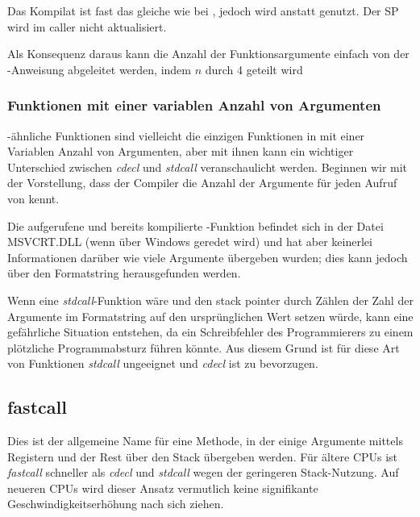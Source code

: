 Das Kompilat ist fast das gleiche wie bei ,
jedoch wird  anstatt  genutzt. Der \ac{SP} wird im \gls{caller} nicht
aktualisiert.

Als Konsequenz daraus kann die Anzahl der Funktionsargumente einfach von der -Anweisung
abgeleitet werden, indem $n$ durch 4 geteilt wird

%


\subsubsection{Funktionen mit einer variablen Anzahl von Argumenten}

\printf-ähnliche Funktionen sind vielleicht die einzigen Funktionen in \CCpp mit einer Variablen
Anzahl von Argumenten, aber mit ihnen kann ein wichtiger Unterschied zwischen \emph{cdecl} und
\emph{stdcall} veranschaulicht werden.
Beginnen wir mit der Vorstellung, dass der Compiler die Anzahl der Argumente für jeden Aufruf
von \printf kennt.

Die aufgerufene und bereits kompilierte \printf-Funktion befindet sich in der Datei MSVCRT.DLL
(wenn über Windows geredet wird) und hat aber keinerlei Informationen darüber wie viele Argumente
übergeben wurden; dies kann jedoch über den Formatstring herausgefunden werden.

Wenn \printf eine \emph{stdcall}-Funktion wäre und den \gls{stack pointer} durch Zählen der Zahl
der Argumente im Formatstring auf den ursprünglichen Wert setzen würde, kann eine gefährliche
Situation entstehen, da ein Schreibfehler des Programmierers zu einem plötzliche Programmabsturz
führen könnte.
Aus diesem Grund ist für diese Art von Funktionen \emph{stdcall} ungeeignet und \emph{cdecl} ist
zu bevorzugen.

\subsection{fastcall}
\label{fastcall}

Dies ist der allgemeine Name für eine Methode, in der einige Argumente mittels Registern und
der Rest über den Stack übergeben werden. Für ältere CPUs ist \emph{fastcall} schneller als
\emph{cdecl} und \emph{stdcall} wegen der geringeren Stack-Nutzung.
Auf neueren \ac{CPU}s wird dieser Ansatz vermutlich keine signifikante Geschwindigkeitserhöhung
nach sich ziehen.

